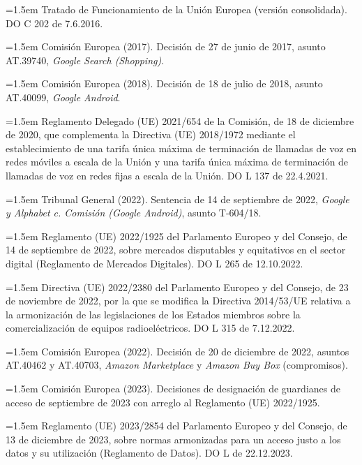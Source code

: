 \documentclass[10pt,a4paper]{article}
\begin{document}
\noindent\hangindent=1.5em Tratado de Funcionamiento de la Unión Europea (versión consolidada). DO C 202 de 7.6.2016.

\noindent\hangindent=1.5em Comisión Europea (2017). Decisión de 27 de junio de 2017, asunto AT.39740, \textit{Google Search (Shopping)}.

\noindent\hangindent=1.5em Comisión Europea (2018). Decisión de 18 de julio de 2018, asunto AT.40099, \textit{Google Android}.

\noindent\hangindent=1.5em Reglamento Delegado (UE) 2021/654 de la Comisión, de 18 de diciembre de 2020, que complementa la Directiva (UE) 2018/1972 mediante el establecimiento de una tarifa única máxima de terminación de llamadas de voz en redes móviles a escala de la Unión y una tarifa única máxima de terminación de llamadas de voz en redes fijas a escala de la Unión. DO L 137 de 22.4.2021.

\noindent\hangindent=1.5em Tribunal General (2022). Sentencia de 14 de septiembre de 2022, \textit{Google y Alphabet c. Comisión (Google Android)}, asunto T-604/18.

\noindent\hangindent=1.5em Reglamento (UE) 2022/1925 del Parlamento Europeo y del Consejo, de 14 de septiembre de 2022, sobre mercados disputables y equitativos en el sector digital (Reglamento de Mercados Digitales). DO L 265 de 12.10.2022.

\noindent\hangindent=1.5em Directiva (UE) 2022/2380 del Parlamento Europeo y del Consejo, de 23 de noviembre de 2022, por la que se modifica la Directiva 2014/53/UE relativa a la armonización de las legislaciones de los Estados miembros sobre la comercialización de equipos radioeléctricos. DO L 315 de 7.12.2022.

\noindent\hangindent=1.5em Comisión Europea (2022). Decisión de 20 de diciembre de 2022, asuntos AT.40462 y AT.40703, \textit{Amazon Marketplace} y \textit{Amazon Buy Box} (compromisos).

\noindent\hangindent=1.5em Comisión Europea (2023). Decisiones de designación de guardianes de acceso de septiembre de 2023 con arreglo al Reglamento (UE) 2022/1925.

\noindent\hangindent=1.5em Reglamento (UE) 2023/2854 del Parlamento Europeo y del Consejo, de 13 de diciembre de 2023, sobre normas armonizadas para un acceso justo a los datos y su utilización (Reglamento de Datos). DO L de 22.12.2023.
\end{document}
